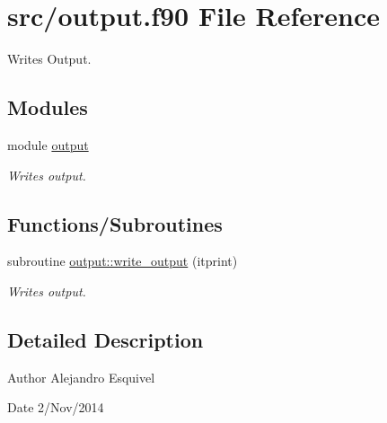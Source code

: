 \hypertarget{output_8f90}{}\section{src/output.f90 File Reference}
\label{output_8f90}


Writes Output.  


\subsection*{Modules}
\begin{DoxyCompactItemize}
\item 
module \hyperlink{namespaceoutput}{output}
\begin{DoxyCompactList}\small\item\em Writes output. \end{DoxyCompactList}\end{DoxyCompactItemize}
\subsection*{Functions/\+Subroutines}
\begin{DoxyCompactItemize}
\item 
subroutine \hyperlink{namespaceoutput_a9a6f65196f6b514f504929c9e1f7582f}{output\+::write\+\_\+output} (itprint)
\begin{DoxyCompactList}\small\item\em Writes output. \end{DoxyCompactList}\end{DoxyCompactItemize}


\subsection{Detailed Description}
\begin{DoxyAuthor}{Author}
Alejandro Esquivel 
\end{DoxyAuthor}
\begin{DoxyDate}{Date}
2/\+Nov/2014 
\end{DoxyDate}

